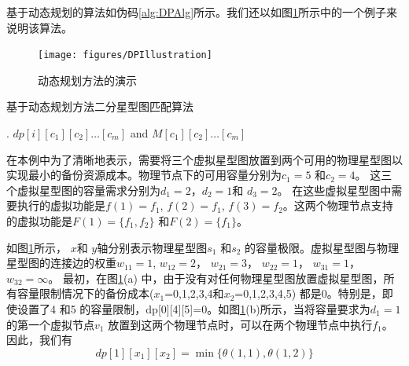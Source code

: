 基于动态规划的算法如伪码\ref{alg:DPAlg}所示。我们还以如图\ref{fig:DPIllustration}所示中的一个例子来说明该算法。


\begin{figure}[htb]
\centering
\texttt{[image: figures/DPIllustration]}\\
  \caption{动态规划方法的演示}\label{fig:DPIllustration}
\end{figure}


\begin{algorithm}
\label{alg:DPAlg}
\caption{基于动态规划方法二分星型图匹配算法}
\begin{algorithmic}[1]


.
\ENDFOR
\ENDFOR
\RETURN $dp[i][{c_1}][{c_2}] \ldots [{c_m}]$ and $M[{c_1}][{c_2}] \ldots [{c_m}]$
\end{algorithmic}
\end{algorithm}

在本例中为了清晰地表示，需要将三个虚拟星型图放置到两个可用的物理星型图以实现最小的备份资源成本。物理节点下的可用容量分别为$c_1=5$ 和$c_2=4$。 这三个虚拟星型图的容量需求分别为$d_1=2$，$d_2=1$和 $d_3=2$。 在这些虚拟星型图中需要执行的虚拟功能是$f(1)=f_1$, $f(2)=f_1$, $f(3)=f_2$。这两个物理节点支持的虚拟功能是$F(1)=\{f_1,f_2\}$ 和$F(2)=\{f_1\}$。

如图\ref{fig:DPIllustration}所示， $x$和 $y$轴分别表示物理星型图$s_1$ 和$s_2$ 的容量极限。虚拟星型图与物理星型图的连接边的权重$w_{11}=1$, $w_{12}=2$， $w_{21}=3$， $w_{22}=1$， $w_{31}=1$， $w_{32}=\infty$。 最初，在图\ref{fig:DPIllustration}(a) 中，由于没有对任何物理星型图放置虚拟星型图，所有容量限制情况下的备份成本($x_1$=0,1,2,3,4和$x_2$=0,1,2,3,4,5) 都是0。特别是，即使设置了4 和5 的容量限制，dp[0][4][5]=0。如图\ref{fig:DPIllustration}(b)所示，当将容量要求为$d_1=1$ 的第一个虚拟节点$v_1$ 放置到这两个物理节点时，可以在两个物理节点中执行$f_1$。因此，我们有
\begin{equation}
dp[1][{x_1}][{x_2}] = \min \{\theta (1,1),\theta (1,2)\}
\end{equation}

